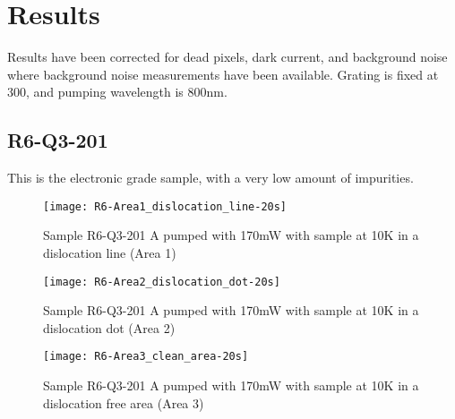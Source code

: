 \section{Results}

Results have been corrected for dead pixels, dark current, and background noise where background noise measurements have been available. Grating is fixed at 300, and pumping wavelength is 800nm.

\subsection{R6-Q3-201}

This is the electronic grade sample, with a very low amount of impurities.



\begin{figure}[H]
\centering
\texttt{[image: R6-Area1\_dislocation\_line-20s]}
\caption[R6-Q3-201 at a dislocation line]{Sample R6-Q3-201 A pumped with 170mW with sample at 10K in a dislocation line (Area 1)}
\label{fig:R6-Area1_dislocation_line-20s}%
\end{figure}


\begin{figure}[H]
\centering
\texttt{[image: R6-Area2\_dislocation\_dot-20s]}
\caption[R6-Q3-201 at a dislocation dot]{Sample R6-Q3-201 A pumped with 170mW with sample at 10K in a dislocation dot (Area 2)}
\label{fig:R6-Area2_dislocation_dot-20s}%
\end{figure}


\begin{figure}[H]
\centering
\texttt{[image: R6-Area3\_clean\_area-20s]}
\caption[R6-Q3-201 at a dislocation free area]{Sample R6-Q3-201 A pumped with 170mW with sample at 10K in a dislocation free area (Area 3)}
\label{fig:R6-Area3_clean_area-20s}%
\end{figure}